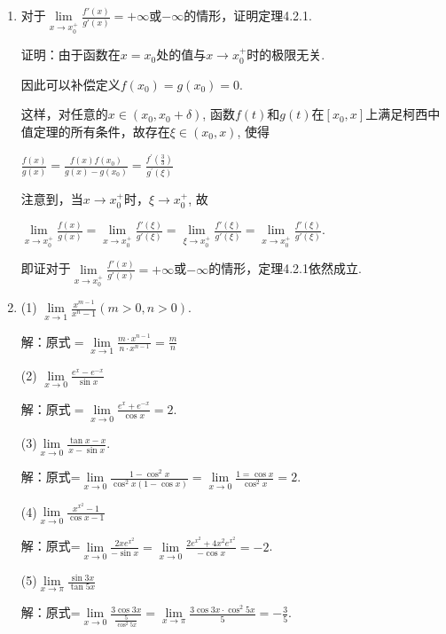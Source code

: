 \documentclass{article}
\begin{document}
		\begin{enumerate}[1.]
			\item 对于$\lim\limits_{x\to x_0^+}\frac{f'(x)}{g'(x)}=+\infty$或$-\infty$的情形，证明定理4.2.1.
			
				证明：由于函数在$x=x_0$处的值与$x\to x_0^+$时的极限无关.
				
				因此可以补偿定义$f(x_0)=g(x_0)=0$.
				
				这样，对任意的$x\in(x_0, x_0+\delta)$, 函数$f(t)$和$g(t)$在$[x_0, x]$上满足柯西中值定理的所有条件，故存在$\xi\in(x_0, x)$, 使得
				
				$\frac{f(x)}{g(x)}=\frac{f(x) f\left(x_{0}\right)}{g(x)-g\left(x_{0}\right)}=\frac{f^{\prime}\left(\frac{3}{3}\right)}{g^{\prime}(\xi)}$
				
				注意到，当$x\to x_0^+$时，$\xi\to x_0^+$, 故
				
				$\lim\limits_{x\to x_0^+}\frac{f(x)}{g(x)}=\lim\limits_{x\to x_0^+}\frac{f'(\xi)}{g'(\xi)}=\lim\limits_{\xi\to x_0^+}\frac{f'(\xi)}{g'(\xi)}=\lim\limits_{x\to x_0^+}\frac{f'(\xi)}{g'(\xi)}.$
				
				即证对于$\lim\limits_{x\to x_0^+}\frac{f'(x)}{g'(x)}=+\infty$或$-\infty$的情形，定理4.2.1依然成立.
			
			\item (1) $\lim\limits_{x \rightarrow 1} \frac{x^{m-1}}{x^{n}-1}(m>0, n>0)$.
			
				解：原式$=\lim\limits _{x \rightarrow 1} \frac{m \cdot x^{n-1}}{n \cdot x^{n-1}}=\frac{m}{n}$
				
				(2) $\lim\limits _{x \rightarrow 0} \frac{e^{x}-e^{-x}}{\sin x}$
				
				解：原式$=\lim\limits _{x \rightarrow 0} \frac{e^{x}+e^{-x}}{\cos x}=2.$
				
				(3)$\lim\limits_{x \rightarrow 0} \frac{\tan x-x}{x-\sin x}$.
				
				解：原式=$\lim\limits_{x \rightarrow 0} \frac{1-\cos ^2 x}{\cos^2 x(1-\cos x)}=\lim\limits_{x \rightarrow 0}\frac{1=\cos x}{\cos ^2 x}=2$.
				
				(4)$\lim\limits_{x \rightarrow 0}\frac{x^{x^2}-1}{\cos x-1}$
				
				解：原式=$\lim\limits_{x \rightarrow 0}\frac{2 x e^{x^{2}}}{-\sin x}=\lim\limits_{x \rightarrow 0} \frac{2 e^{x^{2}}+4 x^{2} e^{x^{2}}}{-\cos x}=-2$.
				
				(5)$\lim\limits_{x \rightarrow \pi}\frac{\sin 3x}{\tan 5x}$
				
				解：原式=$\lim\limits_{x \rightarrow 0}\frac{3\cos 3x}{\frac{5}{\cos^2 5x}}=\lim\limits_{x\to \pi}\frac{3\cos 3x \cdot \cos^2 5x}{5}=-\frac{3}{5}$.
				

\end{enumerate}
\end{document}
